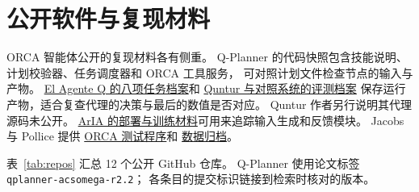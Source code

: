 \documentclass[UTF8,a4paper,11pt,fontset=fandol]{ctexart}
\begin{document}
\section{公开软件与复现材料}
\label{app:repos}
ORCA 智能体公开的复现材料各有侧重。
Q-Planner 的代码快照包含技能说明、计划校验器、任务调度器和 ORCA 工具服务，
可对照计划文件检查节点的输入与产物\cite{qplanner}。
\href{https://doi.org/10.5683/SP3/JU2BQK}
  {El Agente Q 的八项任务档案}和%
\href{https://doi.org/10.5683/SP3/RDSOEA}
  {Quntur 与对照系统的评测档案}
保存运行产物，适合复查代理的决策与最后的数值是否对应。
Quntur 作者另行说明其代理源码未公开\cite{agente,quntur}。
\href{https://doi.org/10.34894/RNPTDS}
  {ArIA 的部署与训练材料}可用来追踪输入生成和反馈模块。
Jacobs 与 Pollice 提供%
\href{https://git.lwp.rug.nl/pollice-research-group/ORCAInputFileSynthesis/-/blob/f60237db580d44849f30179deed090317a4a768a/Classes/Helpers/ORCARunner.py}
  {ORCA 测试程序}和%
\href{https://doi.org/10.34894/WNRHA4}{数据归档}\cite{aria,input}。

表~\ref{tab:repos} 汇总 12 个公开 GitHub 仓库。
Q-Planner 使用论文标签 \texttt{qplanner-acsomega-r2.2}；
各条目的提交标识链接到检索时核对的版本。
\end{document}
